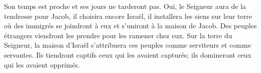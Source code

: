 Son temps est proche et ses jours ne tarderont pas.
Oui, le Seigneur aura de la tendresse pour Jacob, il choisira encore Israël,
	il installera les siens sur leur terre
	où des immigrés se joindront à eux et s’uniront à la maison de Jacob.
Des peuples étrangers viendront les prendre pour les ramener chez eux.
Sur la terre du Seigneur,
	la maison d’Israël s’attribuera ces peuples comme serviteurs et comme servantes.
Ils tiendront captifs ceux qui les avaient capturés;
	ils domineront ceux qui les avaient opprimés.
